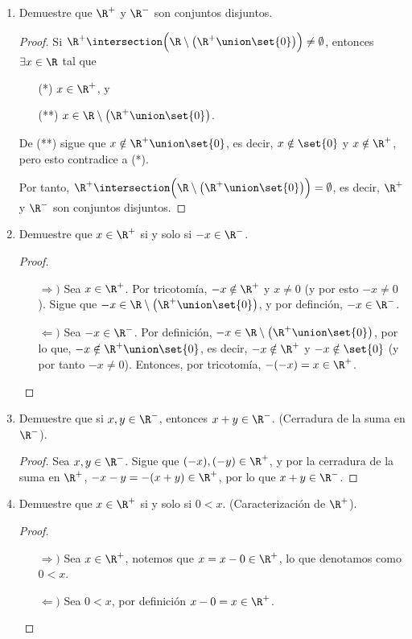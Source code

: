 \begin{enumerate}[label=\alph*)]
 \item Demuestre que $\R^+$ y $\R^-$ son conjuntos disjuntos.
 \begin{proof}%
 Si $\R^+ \intersection \Bigl(\R\setminus\bigl(\R^+\union \set{0}\bigr)\Bigr) \neq \emptyset$, entonces $\exists x\in \R$ tal que \begin{itemize}%
 \item[(*)] $x\in \R^+$, y 
 \item[(**)] $x\in \R\setminus\bigl(\R^+\union \set{0}\bigr)$.
 \end{itemize}  De (**) sigue que $x\notin \R^+\union \set{0}$, es decir, $x\notin \set{0}$ y $x\notin \R^+$, pero esto contradice a (*).

 Por tanto, $\R^+ \intersection \Bigl(\R\setminus\bigl(\R^+\union \set{0}\bigr)\Bigr) = \emptyset$, es decir, $\R^+$ y $\R^-$ son conjuntos disjuntos.
 \end{proof}

 \item Demuestre que $x\in \R^+$ si y solo si $-x\in \R^-$.
 \begin{proof}\leavevmode
 \begin{itemize}
 \item[$\Rightarrow)$] Sea $x\in \R^+$. Por tricotomía, $-x\notin \R^+$ y $x\neq 0$ (y por esto $-x\neq 0$). Sigue que $-x\in \R\setminus \bigl(\R^+\union \set{0}\bigr)$, y por definción, $-x\in \R^-$.
 \item[$\Leftarrow)$] Sea $-x\in \R^-$. Por definición, $-x\in \R\setminus\bigl(\R^+\union \set{0}\bigr)$, por lo que, $-x\notin \R^+\union \set{0}$, es decir, $-x\notin \R^+$ y $-x\notin \set{0}$ (y por tanto $-x\neq 0$). Entonces, por tricotomía, $-(-x)=x\in \R^+$. \qedhere
 \end{itemize}
 \end{proof}

 \item Demuestre que si $x,y \in \R^-$, entonces $x+y\in \R^-$. (Cerradura de la suma en $\R^-$).
 \begin{proof}
 Sea $x,y\in \R^-$. Sigue que $(-x), (-y)\in \R^+$, y por la cerradura de la suma en $\R^+$, $-x-y=-(x+y)\in \R^+$, por lo que $x+y\in \R^-$.
 \end{proof}

 \item Demuestre que $x\in \R^+$ si y solo si $0<x$. (Caracterización de $\R^+$).
 \begin{proof}\leavevmode
 \begin{itemize}
 \item[$\Rightarrow)$] Sea $x\in \R^+$, notemos que $x=x-0\in \R^+$, lo que denotamos como $0<x$.
 \item[$\Leftarrow)$] Sea $0<x$, por definición $x-0=x\in \R^+$. \qedhere
 \end{itemize}
 \end{proof}


\end{enumerate}
